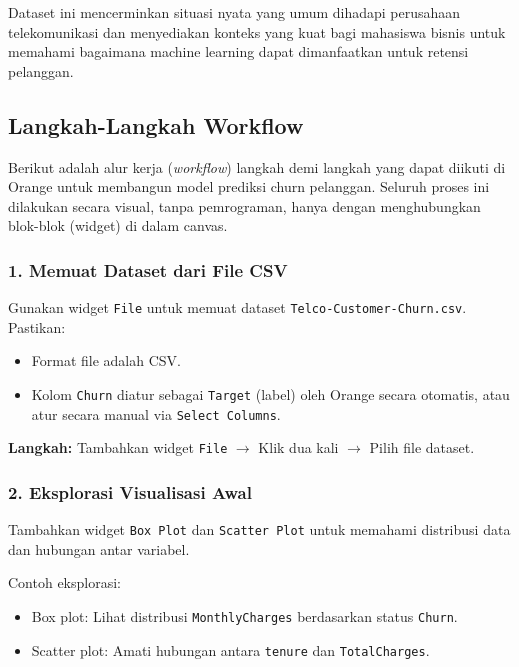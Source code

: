 Dataset ini mencerminkan situasi nyata yang umum dihadapi perusahaan telekomunikasi dan menyediakan konteks yang kuat bagi mahasiswa bisnis untuk memahami bagaimana machine learning dapat dimanfaatkan untuk retensi pelanggan.

 
 
\subsection{Langkah-Langkah Workflow}

Berikut adalah alur kerja (\textit{workflow}) langkah demi langkah yang dapat diikuti di Orange untuk membangun model prediksi churn pelanggan. Seluruh proses ini dilakukan secara visual, tanpa pemrograman, hanya dengan menghubungkan blok-blok (widget) di dalam canvas.

\subsubsection*{1. Memuat Dataset dari File CSV}

Gunakan widget \texttt{File} untuk memuat dataset \texttt{Telco-Customer-Churn.csv}. Pastikan:
\begin{itemize}
	\item Format file adalah CSV.
	\item Kolom \texttt{Churn} diatur sebagai \texttt{Target} (label) oleh Orange secara otomatis, atau atur secara manual via \texttt{Select Columns}.
\end{itemize}

\textbf{Langkah:} Tambahkan widget \texttt{File} $\rightarrow$ Klik dua kali $\rightarrow$ Pilih file dataset.

\subsubsection*{2. Eksplorasi Visualisasi Awal}

Tambahkan widget \texttt{Box Plot} dan \texttt{Scatter Plot} untuk memahami distribusi data dan hubungan antar variabel.

Contoh eksplorasi:
\begin{itemize}
	\item Box plot: Lihat distribusi \texttt{MonthlyCharges} berdasarkan status \texttt{Churn}.
	\item Scatter plot: Amati hubungan antara \texttt{tenure} dan \texttt{TotalCharges}.
\end{itemize}

